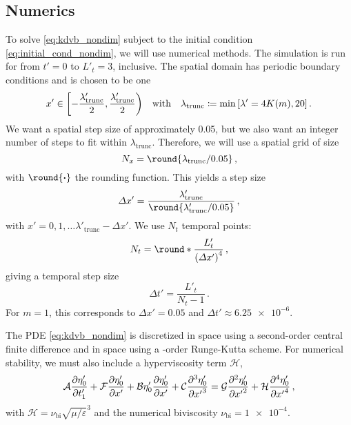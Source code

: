 \documentclass{jfm}
\let\Oldsubsection\subsection
\renewcommand{\subsection}{\FloatBarrier\Oldsubsection}
\DeclarePairedDelimiter{\round}\lfloor\rceil
\renewcommand*{\epsilon}{\varepsilon}
\begin{document}
\subsection{Numerics}
To solve \cref{eq:kdvb_nondim} subject to the initial condition
\cref{eq:initial_cond_nondim}, we will use numerical methods.
The simulation is run for from $t'= 0$ to $L'_t = 3$, inclusive.
The spatial domain has periodic boundary conditions and is chosen to be
one
\begin{equation}
  x' \in \biggl[-\frac{\lambda_{\text{trunc}}'}{2},
    \frac{\lambda'_{\text{trunc}}}{2} \biggr)
  \qq{with}
  \lambda_{\text{trunc}} \coloneqq \min \bqty{\lambda'=4K(m) , 20} \,.
\end{equation}
We want a spatial step size of approximately \num{0.05}, but we also
want an integer number of steps to fit within $\lambda_{\text{trunc}}$.
Therefore, we will use a spatial grid of size
\begin{equation}
  N_x = \round{\lambda_{\text{trunc}}/0.05} \,,
\end{equation}
with $\round{\vdot}$ the rounding function.
This yields a step size
\begin{equation}
  \Delta x' = \frac{\lambda'_{\text{trunc}}}
    {\round{\lambda'_{\text{trunc}}/0.05}} \,,
\end{equation}
with $x' = 0, 1, \ldots \lambda'_{\text{trunc}} - \Delta x'$.
We use $N_t$ temporal points:
\begin{equation}
  N_t =  \round*{\frac{L'_t}{\pqty{\Delta x'}^4}} \,,
\end{equation}
giving a temporal step size
\begin{equation}
  \Delta t' = \frac{L'_t}{N_t -1} \,.
\end{equation}
For $m=1$, this corresponds to $\Delta x' = \num{0.05}$ and $\Delta t'
\approx \num{6.25e-6}$.

The PDE \cref{eq:kdvb_nondim} is discretized in space using a
second-order central finite difference and in space using a
-order Runge-Kutta scheme.
For numerical stability, we must also include a hyperviscosity term
$\mathcal{H}$,
\begin{equation}
  \mathcal{A} \pdv{\eta'_0}{t'_1} + \mathcal{F} \pdv{\eta'_0}{x'} + \mathcal{B}
  \eta'_0 \pdv{\eta'_0}{x'} + \mathcal{C} \pdv[3]{\eta'_0}{{x'}} =
  \mathcal{G} \pdv[2]{\eta'_0}{{x'}} + \mathcal{H}
  \pdv[4]{\eta'_0}{{x'}} \,,
\end{equation}
with $\mathcal{H} = \nu_{\text{bi}} \sqrt{\mu/\epsilon}^3$ and the
numerical biviscosity $\nu_{\text{bi}} = \num{1e-4}$.
\end{document}
